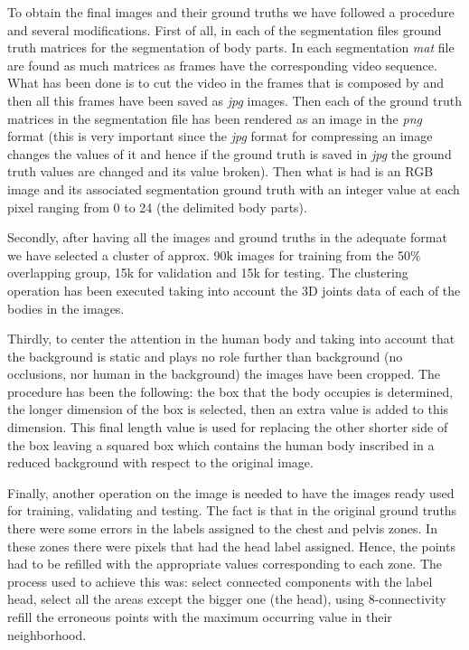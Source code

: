\documentclass[12pt,a4paper]{article}
\begin{document}
To obtain the final images and their ground truths we have followed a procedure and several modifications. First of all, in each of the segmentation files ground truth matrices for the segmentation of body parts. In each segmentation \textit{mat} file are found as much matrices as frames have the corresponding video sequence. What has been done is to cut the video in the frames that is composed by and then all this frames have been saved as \textit{jpg} images. Then each of the ground truth matrices in the segmentation file has been rendered as an image in the \textit{png} format (this is very important since the \textit{jpg} format for compressing an image changes the values of it and hence if the ground truth is saved in \textit{jpg} the ground truth values are changed and its value broken). Then what is had is an RGB image and its associated segmentation ground truth with an integer value at each pixel ranging from 0 to 24 (the delimited body parts). \newline

Secondly, after having all the images and ground truths in the adequate format we have selected a cluster of approx. 90k images for training from the 50$\%$ overlapping group, 15k for validation and 15k for testing. The clustering operation has been executed taking into account the 3D joints data of each of the bodies in the images.\newline

Thirdly, to center the attention in the human body and taking into account that the background is static and plays no role further than background (no occlusions, nor human in the background) the images have been cropped. The procedure has been the following: the box that the body occupies is determined, the longer dimension of the box is selected, then an extra value is added to this dimension. This final length value is used for replacing the other shorter side of the box leaving a squared box which contains the human body inscribed in a reduced background with respect to the original image. \newline

Finally, another operation on the image is needed to have the images ready used for training, validating and testing. The fact is that in the original ground truths there were some errors in the labels assigned to the chest and pelvis zones. In these zones there were pixels that had the head label assigned. Hence, the points had to be refilled with the appropriate values corresponding to each zone. The process used to achieve this was: select connected components with the label head, select all the areas except the bigger one (the head), using 8-connectivity refill the erroneous points with the maximum occurring value in their neighborhood.\newline
\end{document}
